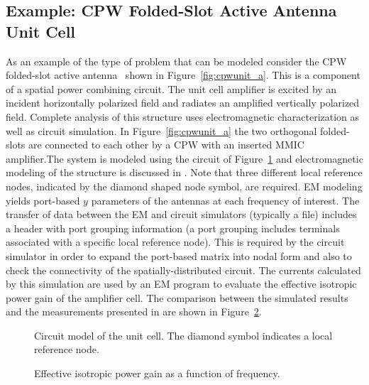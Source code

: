 \subsection{Example: CPW Folded-Slot Active Antenna Unit Cell}

As an example of the type of problem that can be modeled consider the
CPW folded-slot active antenna~\cite{rodwell} shown in
Figure~\ref{fig:cpwunit_a}.  This is a component of a spatial power
combining circuit.  The unit cell amplifier is excited by an incident
horizontally polarized field and radiates an amplified vertically
polarized field.  Complete analysis of this structure uses
electromagnetic characterization as well as circuit simulation.  In
Figure~\ref{fig:cpwunit_a} the two orthogonal folded-slots are connected
to each other by a CPW with an inserted MMIC amplifier.The system is
modeled using the circuit of Figure~\ref{fig:cpwcircuit_a} and
electromagnetic modeling of the structure is discussed in
\cite{steer:abdullah:1998,mostafa,usman}. Note that three different
local reference nodes, indicated by the diamond shaped node symbol,
are required.  EM modeling yields port-based $y$ parameters of the
antennas at each frequency of interest. The transfer of data between
the EM and circuit simulators (typically a file) includes a header
with port grouping information (a port grouping includes terminals
associated with a specific local reference node). This is required by
the circuit simulator in order to expand the port-based matrix into
nodal form and also to check the connectivity of the
spatially-distributed circuit.  The currents calculated by this
simulation are used by an EM program to evaluate the effective
isotropic power gain of the amplifier cell. The comparison between the
simulated results and the measurements presented in \cite{rodwell} are
shown in Figure~\ref{fig:gain_eipg}.

%
\begin{figure*}[htpb]
\centerline{\epsfxsize=13cm }
\caption{Unit cell of the CPW antenna array.} \label{fig:cpwunit_a}
\end{figure*}
%

%
\begin{figure}[htpb]
\centerline{\epsfxsize=13cm }
\caption{Circuit model of the unit cell. The diamond symbol indicates
a local reference node.} \label{fig:cpwcircuit_a}
\end{figure}
%

%
\begin{figure}[htpb]
\centerline{\epsfxsize=13cm }
\caption{Effective isotropic power gain as a function of frequency.}
\label{fig:gain_eipg}
\end{figure}
%

